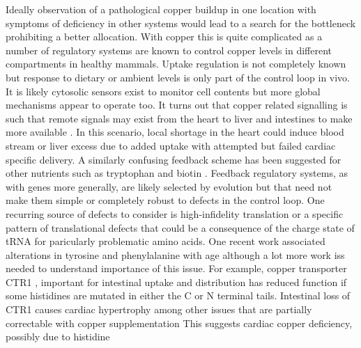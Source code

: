 {Ideally observation of a pathological copper 
buildup in one location with symptoms of deficiency
in other systems would lead to a search for 
the bottleneck prohibiting a better allocation.
With copper this is quite complicated as 
a number of regulatory systems are known to control
copper levels in different compartments  in healthy mammals.
Uptake regulation is not completely known but response to
dietary or ambient levels is only part of the control
loop in vivo. It is  likely cytosolic sensors exist \cite{PMC6365104}
to monitor cell contents but more global mechanisms appear to 
operate too.
It turns out that copper related signalling is such that remote 
signals may exist from the heart
to liver and intestines to make more available
\cite{Kim_Turski_Nose_Cardiac_Copper_Deficiency_Activates_2010}
\cite{xxx_Mechanism_regulation_2010}. In this scenario, local
shortage in the heart could induce blood stream or liver excess 
due to added
uptake with attempted but failed   cardiac specific delivery.
A similarly confusing  feedback scheme 
has been suggested for other nutrients such as tryptophan
\cite{mmarchywka-MJM-2021-007-.1-table-rg}
and biotin
\cite{marchywka-MJM-2022-010-0.80}
\cite{marchywka-MJM-2021-015-0.50-rg}
.  Feedback  regulatory systems, as with genes more generally,  are likely 
selected by evolution but that need not make them simple
or  completely robust to defects in the control loop.
One recurring source of defects to consider is  high-infidelity
translation or a specific pattern of translational defects that could be
a consequence 
of the charge state of tRNA for paricularly problematic
amino acids.  
One recent work associated alterations in tyrosine and phenylalanine with age
\cite{PMC12142579}  although a lot more work iss needed to understand importance of this issue. 
For example, copper transporter CTR1 , important for
intestinal uptake  
\cite{Nose_Kim_Thiele_Ctr1_drives_intestinal_copper_2006}
and distribution  
\cite{Lee_Prohaska_Thiele_Essential_role_mammalian_2001}
\cite{PMC9759326}
\cite{PMC34439}
has  reduced function  if some
histidines are mutated in either the C or N terminal tails. 
Intestinal loss of CTR1 causes cardiac hypertrophy
among other issues that are partially correctable with copper supplementation
\cite{Nose_Kim_Thiele_Ctr1_drives_intestinal_copper_2006}
This suggests cardiac copper deficiency, possibly due to histidine 
}
